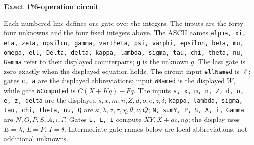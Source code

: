 \documentclass[10pt]{article}
\begin{document}
\clearpage
\begin{center}{\large\bfseries Exact 176-operation circuit}\end{center}
Each numbered line defines one gate over the integers. The inputs are the
forty-four unknowns and the four fixed integers above. The ASCII names
\texttt{alpha, xi, eta, zeta, upsilon, gamma, vartheta, psi, varphi, epsilon, beta, mu, omega, ell, Delta, delta, kappa, lambda, sigma, tau, chi, theta, nu, Gamma}
refer to their displayed counterparts; \texttt{g} is the unknown $g$. The last
gate is zero exactly when the displayed equation holds. The circuit input
\texttt{ellNamed} is $\ell$; gates \texttt{c, a} are the displayed abbreviations; input \texttt{WNamed} is the
displayed $W$, while gate \texttt{WComputed} is $C(X+Kq)-Fq$. The inputs
\texttt{s, x, m, n, Z, d, o, e, z, delta} are the displayed
$s,x,m,n,Z,d,o,e,z,\delta$; \texttt{kappa, lambda, sigma, tau, chi, theta, nu, Q}
are $\kappa,\lambda,\sigma,\tau,\chi,\theta,\nu,Q$; \texttt{N, sumY, P, S, A, i, Gamma}
are $N,O,P,S,A,i,\Gamma$. Gates \texttt{E, L, I} compute $XY,X+ac,ng$;
the display uses $E=\lambda$, $L=P$, $I=\theta$. Intermediate gate
names below are local abbreviations, not additional unknowns.
\end{document}
